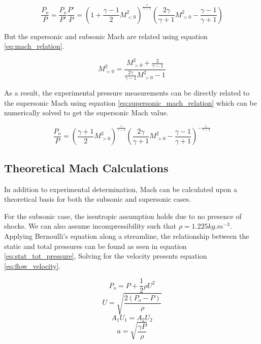 \documentclass[runningheads]{llncs}
\begin{document}
\begin{equation*}
    \frac{P_o}{P} = \frac{P_o}{P'}\frac{P'}{P} = \left(1+\frac{\gamma - 1}{2}M_{<0}^2\right)^{\frac{\gamma}{\gamma - 1}}\left(\frac{2\gamma}{\gamma + 1}M_{>0}^2 - \frac{\gamma - 1}{\gamma + 1}\right)
\end{equation*}

\noindent
But the supersonic and subsonic Mach are related using equation \ref{eq:mach_relation}.

\begin{equation}
    M_{<0}^2=\frac{M_{>0}^2+\frac{2}{\gamma - 1}}{\frac{2\gamma}{\gamma - 1}M_{>0}^2 - 1}
    \label{eq:mach_relation}
\end{equation}

\noindent
As a result, the experimental pressure measurements can be directly related to the supersonic Mach using equation \ref{eq:supersonic_mach_relation} which can be numerically solved to get the supersonic Mach value.

\begin{equation}
    \frac{P_o}{P} = \left(\frac{\gamma + 1}{2}M_{>0}^2\right)^{\frac{\gamma}{\gamma - 1}}\left(\frac{2\gamma}{\gamma + 1}M_{>0}^2 - \frac{\gamma - 1}{\gamma + 1}\right)^{-\frac{1}{\gamma - 1}}
    \label{eq:supersonic_mach_relation}
\end{equation}

\subsection{Theoretical Mach Calculations}

In addition to experimental determination, Mach can be calculated upon a theoretical basis for both the subsonic and supersonic cases.\newline

\noindent
For the subsonic case, the isentropic assumption holds due to no presence of shocks. We can also assume incompressibility such that $\rho=1.225\si{kg}.\si{m}^{-3}$. Applying Bernoulli's equation along a streamline, the relationship between the static and total pressures can be found as seen in equation \ref{eq:stat_tot_pressure}, Solving for the velocity presents equation \ref{eq:flow_velocity}.

\begin{multicols}{4}
\begin{equation}
    P_o = P + \frac{1}{2}\rho U^2
    \label{eq:stat_tot_pressure}
\end{equation}
\begin{equation}
    U = \sqrt{\frac{2(P_o - P)}{\rho}}
    \label{eq:flow_velocity}
\end{equation}
\begin{equation}
    A_1U_1 = A_2U_2
    \label{eq:area_velocity_relation}
\end{equation}
\begin{equation}
    a = \sqrt{\frac{\gamma P}{\rho}}
    \label{eq:speed_of_sound}
\end{equation}
\end{multicols}
\end{document}
